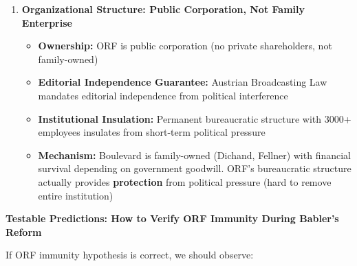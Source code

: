 \begin{enumerate}
\item \textbf{Organizational Structure: Public Corporation, Not Family Enterprise}
  \begin{itemize}
  \item \textbf{Ownership:} ORF is public corporation (no private shareholders, not family-owned)
  \item \textbf{Editorial Independence Guarantee:} Austrian Broadcasting Law mandates editorial independence
    from political interference
  \item \textbf{Institutional Insulation:} Permanent bureaucratic structure with 3000+ employees insulates
    from short-term political pressure
  \item \textbf{Mechanism:} Boulevard is family-owned (Dichand, Fellner) with financial survival depending on
    government goodwill. ORF's bureaucratic structure actually provides \textbf{protection} from political
    pressure (hard to remove entire institution)
  \end{itemize}

\end{enumerate}

\textbf{Testable Predictions: How to Verify ORF Immunity During Babler's Reform}

If ORF immunity hypothesis is correct, we should observe:

